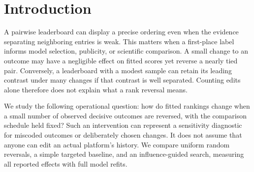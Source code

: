 \begin{abstract}
Pairwise leaderboards turn comparison outcomes into an ordered list, but the stability of that list depends on both the observed evidence and the fitted model. We audit retrospective outcome-flip sensitivity in public Chatbot Arena preferences, MT-Bench human and GPT-4 judgments, and ten NBA regular seasons. We reverse distinct decisive outcomes while preserving comparison schedules and ties, then refit a ridge Bradley--Terry model. Influence-guided searches find reversals of the original leading pair after 2 of 57,477 Arena outcomes, 46 of 3,355 MT-Bench human judgments, 61 of 2,400 GPT-4 judgments, and 1--8 games per NBA season. These are successful-edit upper bounds, not minimum budgets. Arena and every NBA leading-pair bootstrap interval already include zero; the two MT-Bench intervals exclude it. On identical MT-Bench comparison cells, a paired question bootstrap gives a mean human-minus-GPT-4 found edit fraction of $-1.20$ percentage points, with a descriptive percentile range of $[-2.24,-0.11]$ points for a fixed reference pair. Sensitivity also changes with tie handling and regularization. The results support reporting edit witnesses alongside sampling uncertainty and modeling conventions; they do not establish that an evaluation design is inherently more vulnerable or that retrospective flips are operational attacks.
\end{abstract}

\section{Introduction}
A pairwise leaderboard can display a precise ordering even when the evidence separating neighboring entries is weak. This matters when a first-place label informs model selection, publicity, or scientific comparison. A small change to an outcome may have a negligible effect on fitted scores yet reverse a nearly tied pair. Conversely, a leaderboard with a modest sample can retain its leading contrast under many changes if that contrast is well separated. Counting edits alone therefore does not explain what a rank reversal means.

We study the following operational question: how do fitted rankings change when a small number of observed decisive outcomes are reversed, with the comparison schedule held fixed? Such an intervention can represent a sensitivity diagnostic for miscoded outcomes or deliberately chosen changes. It does not assume that anyone can edit an actual platform's history. We compare uniform random reversals, a simple targeted baseline, and an influence-guided search, measuring all reported effects with full model refits.

